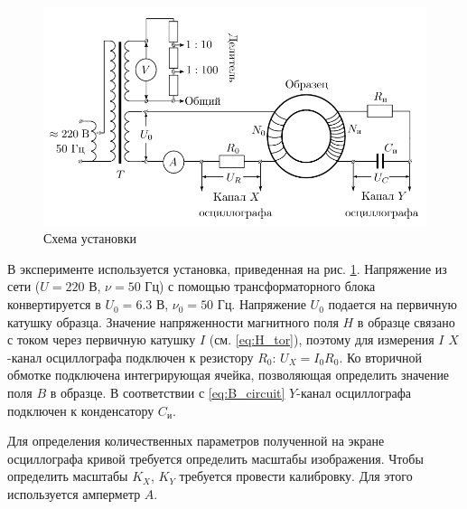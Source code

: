 \begin{figure}
	\vspace{-10pt}
	\includegraphics[width=\linewidth]{../res/scheme.png}
	\caption{Схема установки}
	\label{img:scheme}
	\end{figure}

В эксперименте используется установка, приведенная на рис. \ref{img:scheme}. Напряжение из сети ($U = 220$ В, $\nu = 50$ Гц) с помощью трансформаторного блока конвертируется в $U_0 = 6.3$ В, $\nu_0 = 50$ Гц. Напряжение $U_0$ подается на первичную катушку образца. Значение напряженности магнитного поля $H$ в образце связано с током через первичную катушку $I$ (см. \ref{eq:H_tor}), поэтому для измерения $I$ $X$-канал осциллографа подключен к резистору $R_0$: $U_X = I_0 R_0$. Ко вторичной обмотке подключена интегрирующая ячейка, позволяющая определить значение поля $B$ в образце. В соответствии с \ref{eq:B_circuit} $Y$-канал осциллографа подключен к конденсатору $C_{\text{и}}$.

Для определения количественных параметров полученной на экране осциллографа кривой требуется определить масштабы изображения. Чтобы определить масштабы $K_X$, $K_Y$ требуется провести калибровку. Для этого используется амперметр $A$.


